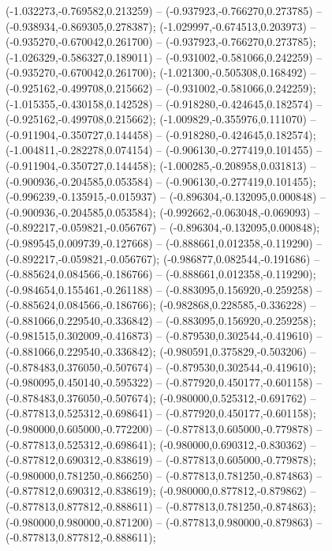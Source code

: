  (-1.032273,-0.769582,0.213259) -- (-0.937923,-0.766270,0.273785) -- (-0.938934,-0.869305,0.278387);
 (-1.029997,-0.674513,0.203973) -- (-0.935270,-0.670042,0.261700) -- (-0.937923,-0.766270,0.273785);
 (-1.026329,-0.586327,0.189011) -- (-0.931002,-0.581066,0.242259) -- (-0.935270,-0.670042,0.261700);
 (-1.021300,-0.505308,0.168492) -- (-0.925162,-0.499708,0.215662) -- (-0.931002,-0.581066,0.242259);
 (-1.015355,-0.430158,0.142528) -- (-0.918280,-0.424645,0.182574) -- (-0.925162,-0.499708,0.215662);
 (-1.009829,-0.355976,0.111070) -- (-0.911904,-0.350727,0.144458) -- (-0.918280,-0.424645,0.182574);
 (-1.004811,-0.282278,0.074154) -- (-0.906130,-0.277419,0.101455) -- (-0.911904,-0.350727,0.144458);
 (-1.000285,-0.208958,0.031813) -- (-0.900936,-0.204585,0.053584) -- (-0.906130,-0.277419,0.101455);
 (-0.996239,-0.135915,-0.015937) -- (-0.896304,-0.132095,0.000848) -- (-0.900936,-0.204585,0.053584);
 (-0.992662,-0.063048,-0.069093) -- (-0.892217,-0.059821,-0.056767) -- (-0.896304,-0.132095,0.000848);
 (-0.989545,0.009739,-0.127668) -- (-0.888661,0.012358,-0.119290) -- (-0.892217,-0.059821,-0.056767);
 (-0.986877,0.082544,-0.191686) -- (-0.885624,0.084566,-0.186766) -- (-0.888661,0.012358,-0.119290);
 (-0.984654,0.155461,-0.261188) -- (-0.883095,0.156920,-0.259258) -- (-0.885624,0.084566,-0.186766);
 (-0.982868,0.228585,-0.336228) -- (-0.881066,0.229540,-0.336842) -- (-0.883095,0.156920,-0.259258);
 (-0.981515,0.302009,-0.416873) -- (-0.879530,0.302544,-0.419610) -- (-0.881066,0.229540,-0.336842);
 (-0.980591,0.375829,-0.503206) -- (-0.878483,0.376050,-0.507674) -- (-0.879530,0.302544,-0.419610);
 (-0.980095,0.450140,-0.595322) -- (-0.877920,0.450177,-0.601158) -- (-0.878483,0.376050,-0.507674);
 (-0.980000,0.525312,-0.691762) -- (-0.877813,0.525312,-0.698641) -- (-0.877920,0.450177,-0.601158);
 (-0.980000,0.605000,-0.772200) -- (-0.877813,0.605000,-0.779878) -- (-0.877813,0.525312,-0.698641);
 (-0.980000,0.690312,-0.830362) -- (-0.877812,0.690312,-0.838619) -- (-0.877813,0.605000,-0.779878);
 (-0.980000,0.781250,-0.866250) -- (-0.877813,0.781250,-0.874863) -- (-0.877812,0.690312,-0.838619);
 (-0.980000,0.877812,-0.879862) -- (-0.877813,0.877812,-0.888611) -- (-0.877813,0.781250,-0.874863);
 (-0.980000,0.980000,-0.871200) -- (-0.877813,0.980000,-0.879863) -- (-0.877813,0.877812,-0.888611);
